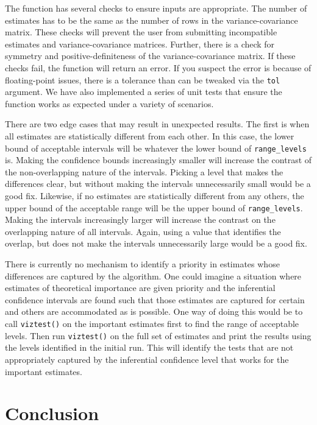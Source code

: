 The function has several checks to ensure inputs are appropriate. The number of estimates has to be the same as the number of rows in the variance-covariance matrix. These checks will prevent the user from submitting incompatible estimates and variance-covariance matrices. Further, there is a check for symmetry and positive-definiteness of the variance-covariance matrix. If these checks fail, the function will return an error. If you suspect the error is because of floating-point issues, there is a tolerance than can be tweaked via the \texttt{tol} argument. We have also implemented a series of unit tests that ensure the function works as expected under a variety of scenarios.

There are two edge cases that may result in unexpected results. The first is when all estimates are statistically different from each other. In this case, the lower bound of acceptable intervals will be whatever the lower bound of \texttt{range\_levels} is. Making the confidence bounds increasingly smaller will increase the contrast of the non-overlapping nature of the intervals. Picking a level that makes the differences clear, but without making the intervals unnecessarily small would be a good fix. Likewise, if no estimates are statistically different from any others, the upper bound of the acceptable range will be the upper bound of \texttt{range\_levels}. Making the intervals increasingly larger will increase the contrast on the overlapping nature of all intervals. Again, using a value that identifies the overlap, but does not make the intervals unnecessarily large would be a good fix.

There is currently no mechanism to identify a priority in estimates whose differences are captured by the algorithm. One could imagine a situation where estimates of theoretical importance are given priority and the inferential confidence intervals are found such that those estimates are captured for certain and others are accommodated as is possible. One way of doing this would be to call \texttt{viztest()} on the important estimates first to find the range of acceptable levels. Then run \texttt{viztest()} on the full set of estimates and print the results using the levels identified in the initial run. This will identify the tests that are not appropriately captured by the inferential confidence level that works for the important estimates.

\section{Conclusion}\label{conclusion}

